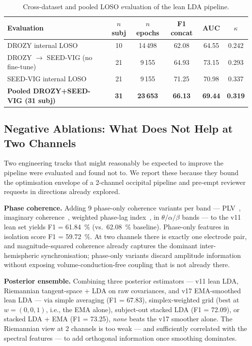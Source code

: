 \documentclass[journal]{IEEEtran}
\DeclareRobustCommand{\add}[1]{#1}                         %
\DeclareRobustCommand{\del}[1]{}                           %
\DeclareRobustCommand{\add}[1]{\hl{#1}}
\DeclareRobustCommand{\del}[1]{{\color{delred}\sout{#1}}\,}
\DeclareRobustCommand{\del}[1]{}                         %
\DeclareRobustCommand{\chg}[2]{\del{#1}\add{#2}}
\begin{document}
\begin{table}[t]
\caption{Cross-dataset and pooled LOSO evaluation of the lean LDA pipeline.}
\label{tab:cross}
\centering
\footnotesize
\setlength{\tabcolsep}{3pt}
\begin{tabular}{l c c c c c}
\toprule
Evaluation                       & \(n\) subj & \(n\) epochs & F1 concat & AUC & \(\kappa\) \\
\midrule
DROZY internal LOSO              & 10 & 14\,498 & 62.08 & 64.55 & 0.242 \\
DROZY \(\to\) SEED-VIG (no fine-tune) & 21 & 9\,155 & 64.93 & 73.15 & 0.293 \\
SEED-VIG internal LOSO           & 21 & 9\,155 & 71.25 & 70.98 & 0.337 \\
\textbf{Pooled DROZY+SEED-VIG (31 subj)} & \textbf{31} & \textbf{23\,653} & \textbf{66.13} & \textbf{69.44} & \textbf{0.319} \\
\bottomrule
\end{tabular}
\end{table}

\subsection{\chg{Negative Ablations}{Negative Ablations: What Does Not Help at Two Channels}}
\label{sec:negative}
Two engineering tracks that might reasonably be expected to improve the pipeline were evaluated and found not to. We report these because they bound the optimisation envelope of a 2-channel occipital pipeline and pre-empt reviewer requests in directions already explored.

\textbf{Phase coherence.} Adding 9 phase-only coherence variants per band --- PLV~\cite{lachaux1999plv}, imaginary coherence~\cite{nolte2004imcoh}, weighted phase-lag index~\cite{vinck2011wpli}, in \(\theta/\alpha/\beta\) bands --- to the v11 lean set yields F1 = 61.84~\% (vs.\ 62.08~\% baseline). Phase-only features in isolation score F1 = 59.72~\%. At two channels there is exactly one electrode pair, and magnitude-squared coherence already captures the dominant inter-hemispheric synchronisation; phase-only variants discard amplitude information without exposing volume-conduction-free coupling that is not already there.

\textbf{Posterior ensemble.} Combining three posterior estimators --- v11 lean LDA, Riemannian tangent-space + LDA on raw covariances, and v17 EMA-smoothed lean LDA --- via simple averaging (F1 = 67.83), simplex-weighted grid (best at \(w = (0,0,1)\), i.e., the EMA alone), subject-out stacked LDA (F1 = 72.09), or stacked LDA + EMA (F1 = 73.25), \emph{none} beats the v17 smoother alone. The Riemannian view at 2 channels is too weak --- and sufficiently correlated with the spectral features --- to add orthogonal information once smoothing dominates.
\end{document}
